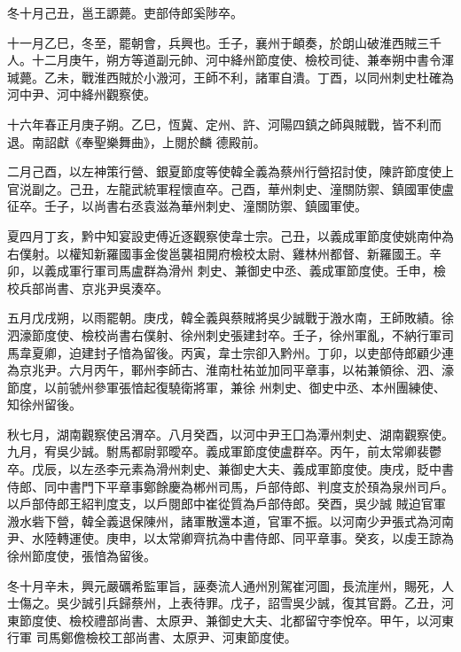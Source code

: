 \begin{pinyinscope}
 冬十月己丑，邕王謜薨。吏部侍郎奚陟卒。



 十一月乙巳，冬至，罷朝會，兵興也。壬子，襄州于頔奏，於朗山破淮西賊三千人。十二月庚午，朔方等道副元帥、河中絳州節度使、檢校司徒、兼奉朔中書令渾瑊薨。乙未，戰淮西賊於小溵河，王師不利，諸軍自潰。丁酉，以同州刺史杜確為河中尹、河中絳州觀察使。



 十六年春正月庚子朔。乙巳，恆冀、定州、許、河陽四鎮之師與賊戰，皆不利而退。南詔獻《奉聖樂舞曲》，上閱於麟
 德殿前。



 二月己酉，以左神策行營、銀夏節度等使韓全義為蔡州行營招討使，陳許節度使上官涚副之。己丑，左龍武統軍程懷直卒。己酉，華州刺史、潼關防禦、鎮國軍使盧征卒。壬子，以尚書右丞袁滋為華州刺史、潼關防禦、鎮國軍使。



 夏四月丁亥，黔中知宴設吏傅近逐觀察使韋士宗。己丑，以義成軍節度使姚南仲為右僕射。以權知新羅國事金俊邕襲祖開府檢校太尉、雞林州都督、新羅國王。辛卯，以義成軍行軍司馬盧群為滑州
 刺史、兼御史中丞、義成軍節度使。壬申，檢校兵部尚書、京兆尹吳湊卒。



 五月戊戌朔，以雨罷朝。庚戌，韓全義與蔡賊將吳少誠戰于溵水南，王師敗績。徐泗濠節度使、檢校尚書右僕射、徐州刺史張建封卒。壬子，徐州軍亂，不納行軍司馬韋夏卿，迫建封子愔為留後。丙寅，韋士宗卻入黔州。丁卯，以吏部侍郎顧少連為京兆尹。六月丙午，鄆州李師古、淮南杜祐並加同平章事，以祐兼領徐、泗、濠節度，以前虢州參軍張愔起復驍衛將軍，兼徐
 州刺史、御史中丞、本州團練使、知徐州留後。



 秋七月，湖南觀察使呂渭卒。八月癸酉，以河中尹王囗為潭州刺史、湖南觀察使。九月，宥吳少誠。駙馬都尉郭曖卒。義成軍節度使盧群卒。丙午，前太常卿裴鬱卒。戊辰，以左丞李元素為滑州刺史、兼御史大夫、義成軍節度使。庚戌，貶中書侍郎、同中書門下平章事鄭餘慶為郴州司馬，戶部侍郎、判度支於䪹為泉州司戶。以戶部侍郎王紹判度支，以戶閱郎中崔從質為戶部侍郎。癸酉，吳少誠
 賊迫官軍溵水砦下營，韓全義退保陳州，諸軍散還本道，官軍不振。以河南少尹張式為河南尹、水陸轉運使。庚申，以太常卿齊抗為中書侍郎、同平章事。癸亥，以虔王諒為徐州節度使，張愔為留後。



 冬十月辛未，興元嚴礪希監軍旨，誣奏流人通州別駕崔河圖，長流崖州，賜死，人士傷之。吳少誠引兵歸蔡州，上表待罪。戊子，詔雪吳少誠，復其官爵。乙丑，河東節度使、檢校禮部尚書、太原尹、兼御史大夫、北都留守李悅卒。甲午，以河東行軍
 司馬鄭儋檢校工部尚書、太原尹、河東節度使。




\end{pinyinscope}
